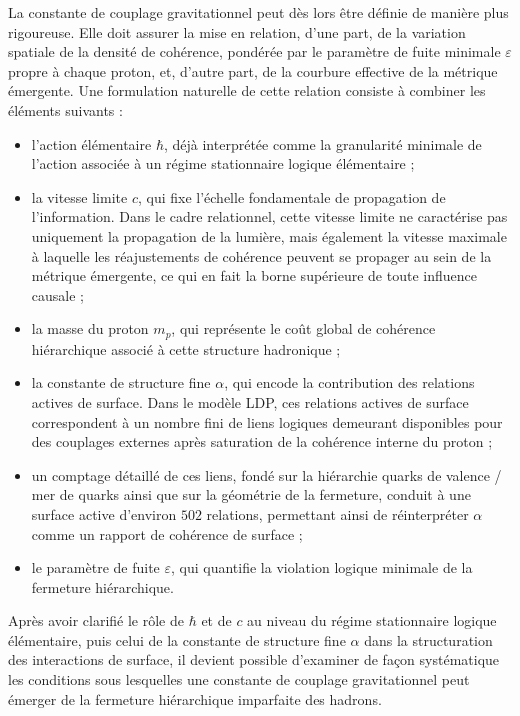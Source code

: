 \documentclass[11pt,a4paper]{article}
\begin{document}
La constante de couplage gravitationnel peut dès lors être définie de manière plus rigoureuse. Elle doit assurer la mise en relation, d’une part, de la variation spatiale de la densité de cohérence, pondérée par le paramètre de fuite minimale \(\varepsilon\) propre à chaque proton, et, d’autre part, de la courbure effective de la métrique émergente. Une formulation naturelle de cette relation consiste à combiner les éléments suivants :
\begin{itemize}
  \item l’action élémentaire \(\hbar\), déjà interprétée comme la granularité minimale de l’action associée à un régime stationnaire logique élémentaire ; 
  \item la vitesse limite \(c\), qui fixe l’échelle fondamentale de propagation de l’information. Dans le cadre relationnel, cette vitesse limite ne caractérise pas uniquement la propagation de la lumière, mais également la vitesse maximale à laquelle les réajustements de cohérence peuvent se propager au sein de la métrique émergente, ce qui en fait la borne supérieure de toute influence causale ; 
  \item la masse du proton \(m_p\), qui représente le coût global de cohérence hiérarchique associé à cette structure hadronique ; 
  \item la constante de structure fine \(\alpha\), qui encode la contribution des relations actives de surface. Dans le modèle LDP, ces relations actives de surface correspondent à un nombre fini de liens logiques demeurant disponibles pour des couplages externes après saturation de la cohérence interne du proton ; 
  \item un comptage détaillé de ces liens, fondé sur la hiérarchie quarks de valence / mer de quarks ainsi que sur la géométrie de la fermeture, conduit à une surface active d’environ \(502\) relations, permettant ainsi de réinterpréter \(\alpha\) comme un rapport de cohérence de surface ; 
  \item le paramètre de fuite \(\varepsilon\), qui quantifie la violation logique minimale de la fermeture hiérarchique. 
\end{itemize}

Après avoir clarifié le rôle de \(\hbar\) et de \(c\) au niveau du régime stationnaire logique élémentaire, puis celui de la constante de structure fine \(\alpha\) dans la structuration des interactions de surface, il devient possible d’examiner de façon systématique les conditions sous lesquelles une constante de couplage gravitationnel peut émerger de la fermeture hiérarchique imparfaite des hadrons.
\end{document}
